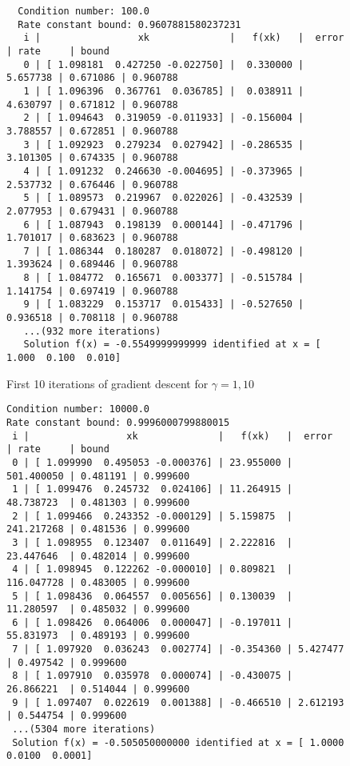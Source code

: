 \begin{solution}
\begin{figure}[h]
\begin{verbatim}
  Condition number: 100.0
  Rate constant bound: 0.9607881580237231
   i |                 xk              |   f(xk)   |  error   | rate     | bound
   0 | [ 1.098181  0.427250 -0.022750] |  0.330000 | 5.657738 | 0.671086 | 0.960788
   1 | [ 1.096396  0.367761  0.036785] |  0.038911 | 4.630797 | 0.671812 | 0.960788
   2 | [ 1.094643  0.319059 -0.011933] | -0.156004 | 3.788557 | 0.672851 | 0.960788
   3 | [ 1.092923  0.279234  0.027942] | -0.286535 | 3.101305 | 0.674335 | 0.960788
   4 | [ 1.091232  0.246630 -0.004695] | -0.373965 | 2.537732 | 0.676446 | 0.960788
   5 | [ 1.089573  0.219967  0.022026] | -0.432539 | 2.077953 | 0.679431 | 0.960788
   6 | [ 1.087943  0.198139  0.000144] | -0.471796 | 1.701017 | 0.683623 | 0.960788
   7 | [ 1.086344  0.180287  0.018072] | -0.498120 | 1.393624 | 0.689446 | 0.960788
   8 | [ 1.084772  0.165671  0.003377] | -0.515784 | 1.141754 | 0.697419 | 0.960788
   9 | [ 1.083229  0.153717  0.015433] | -0.527650 | 0.936518 | 0.708118 | 0.960788
   ...(932 more iterations)
   Solution f(x) = -0.5549999999999 identified at x = [ 1.000  0.100  0.010]
        \end{verbatim}
        \caption{First 10 iterations of gradient descent for $\gamma = 1, 10$}
        \label{fig:gamma_1_10}
    \end{figure}
    \pagebreak
    \begin{figure}[h]
        \centering
        \begin{verbatim}
Condition number: 10000.0
Rate constant bound: 0.9996000799880015
 i |                 xk              |   f(xk)   |  error     | rate     | bound
 0 | [ 1.099990  0.495053 -0.000376] | 23.955000 | 501.400050 | 0.481191 | 0.999600
 1 | [ 1.099476  0.245732  0.024106] | 11.264915 | 48.738723  | 0.481303 | 0.999600
 2 | [ 1.099466  0.243352 -0.000129] | 5.159875  | 241.217268 | 0.481536 | 0.999600
 3 | [ 1.098955  0.123407  0.011649] | 2.222816  | 23.447646  | 0.482014 | 0.999600
 4 | [ 1.098945  0.122262 -0.000010] | 0.809821  | 116.047728 | 0.483005 | 0.999600
 5 | [ 1.098436  0.064557  0.005656] | 0.130039  | 11.280597  | 0.485032 | 0.999600
 6 | [ 1.098426  0.064006  0.000047] | -0.197011 | 55.831973  | 0.489193 | 0.999600
 7 | [ 1.097920  0.036243  0.002774] | -0.354360 | 5.427477   | 0.497542 | 0.999600
 8 | [ 1.097910  0.035978  0.000074] | -0.430075 | 26.866221  | 0.514044 | 0.999600
 9 | [ 1.097407  0.022619  0.001388] | -0.466510 | 2.612193   | 0.544754 | 0.999600
 ...(5304 more iterations)
 Solution f(x) = -0.505050000000 identified at x = [ 1.0000  0.0100  0.0001]


\end{verbatim}
\end{figure}
\end{solution}
